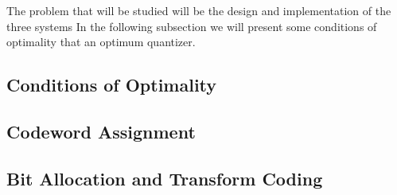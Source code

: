 \documentclass[10pt]{article}
\begin{document}
The problem that will be studied will be the design and implementation of the three systems
In the following subsection we will present some conditions of optimality that an optimum quantizer.

\subsection{Conditions of Optimality}
\label{sec:optim_conds_deriv}

\subsection{Codeword Assignment}
\label{sec:code_assign_deriv}

\subsection{Bit Allocation and Transform Coding}
\label{sec:bit_trans_deriv}
\end{document}
